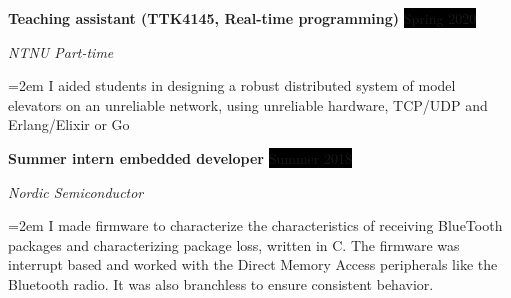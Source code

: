 \documentclass[paper=a4,fontsize=11pt,norsk]{scrartcl} %
\newcommand{\EducationEntry}[4]{
		\noindent \textbf{#1} \hfill      %
		\colorbox{Black}{%
			\parbox{6em}{%
			\hfill\color{White}#2}} \par  %
		\noindent \textit{#3} \par        %
		\noindent\hangindent=2em\hangafter=0 \small #4 %
		\normalsize \par}
\newcommand{\WorkEntry}[4]{				  %
		\noindent \textbf{#1} \hfill      %
		\colorbox{Black}{\color{White}#2} \par  %
		\noindent \textit{#3} \par              %
		\noindent\hangindent=2em\hangafter=0 \small #4 %
		\normalsize \par}
\begin{document}






\WorkEntry{Teaching assistant (TTK4145, Real-time programming)}{Spring 2020}{NTNU Part-time}
{I aided students in designing a robust distributed system of model elevators on an unreliable network, using unreliable hardware, TCP/UDP and Erlang/Elixir or Go}

\WorkEntry{Summer intern embedded developer}{Summer 2018}{Nordic Semiconductor}
{I made firmware to characterize the characteristics of receiving BlueTooth packages and characterizing package loss, written in C. The firmware was interrupt based and worked with the Direct Memory Access peripherals like the Bluetooth radio. It was also branchless to ensure consistent behavior.}
\end{document}
